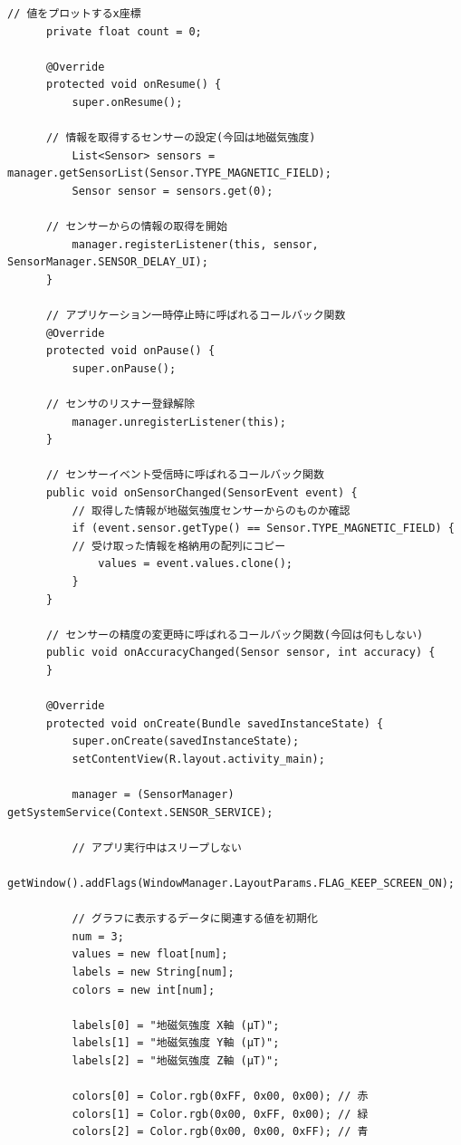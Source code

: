 \documentclass[dvipdfmx,autodetect-engine,titlepage]{jsarticle}
\begin{document}
\begin{lstlisting}[caption=MainActivity.jave,label=java]
      // 値をプロットするx座標
      private float count = 0;
  
      @Override
      protected void onResume() {
          super.onResume();
  
      // 情報を取得するセンサーの設定(今回は地磁気強度)
          List<Sensor> sensors = manager.getSensorList(Sensor.TYPE_MAGNETIC_FIELD);
          Sensor sensor = sensors.get(0);
  
      // センサーからの情報の取得を開始
          manager.registerListener(this, sensor, SensorManager.SENSOR_DELAY_UI);
      }
  
      // アプリケーション一時停止時に呼ばれるコールバック関数
      @Override
      protected void onPause() {
          super.onPause();
  
      // センサのリスナー登録解除
          manager.unregisterListener(this);
      }
  
      // センサーイベント受信時に呼ばれるコールバック関数
      public void onSensorChanged(SensorEvent event) {
          // 取得した情報が地磁気強度センサーからのものか確認
          if (event.sensor.getType() == Sensor.TYPE_MAGNETIC_FIELD) {
          // 受け取った情報を格納用の配列にコピー
              values = event.values.clone();
          }
      }
  
      // センサーの精度の変更時に呼ばれるコールバック関数(今回は何もしない)
      public void onAccuracyChanged(Sensor sensor, int accuracy) {
      }
  
      @Override
      protected void onCreate(Bundle savedInstanceState) {
          super.onCreate(savedInstanceState);
          setContentView(R.layout.activity_main);
  
          manager = (SensorManager) getSystemService(Context.SENSOR_SERVICE);
  
          // アプリ実行中はスリープしない
          getWindow().addFlags(WindowManager.LayoutParams.FLAG_KEEP_SCREEN_ON);
  
          // グラフに表示するデータに関連する値を初期化
          num = 3;
          values = new float[num];
          labels = new String[num];
          colors = new int[num];
  
          labels[0] = "地磁気強度 X軸 (μT)";
          labels[1] = "地磁気強度 Y軸 (μT)";
          labels[2] = "地磁気強度 Z軸 (μT)";
  
          colors[0] = Color.rgb(0xFF, 0x00, 0x00); // 赤
          colors[1] = Color.rgb(0x00, 0xFF, 0x00); // 緑
          colors[2] = Color.rgb(0x00, 0x00, 0xFF); // 青
  

\end{lstlisting}
\end{document}
